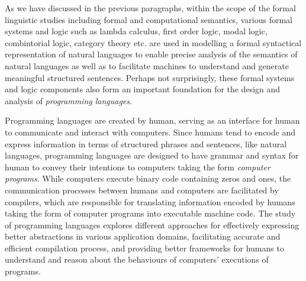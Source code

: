 As we have discussed in the previous paragraphs, within the scope of the formal linguistic studies including formal and computational semantics, various formal systems and logic such as lambda calculus, first order logic, modal logic, combintorial logic, category theory etc. are used in modelling a formal syntactical representation of natural languages to enable precise analysis of the semantics of natural languages as well as to facilitate machines to understand and generate meaningful structured sentences. Perhaps not surprisingly, these formal systems and logic components also form an important foundation for the design and analysis of \emph{programming languages}.


Programming languages are created by human, serving as an interface for human to communicate and interact with computers. Since humans tend to encode and express information in terms of structured phrases and sentences, like natural languages, programming languages are designed to have grammar and syntax for human to convey their intentions to computers taking the form \emph{computer programs}. While computers execute binary code containing zeros and ones, the communication processes between humans and computers are facilitated by compilers, which are responsible for translating information encoded by humans taking the form of computer programs into executable machine code. The study of programming languages explores different approaches for effectively expressing better abstractions in various application domains, facilitating accurate and efficient compilation process, and providing better frameworks for humans to understand and reason about the behaviours of computers' executions of programs.


